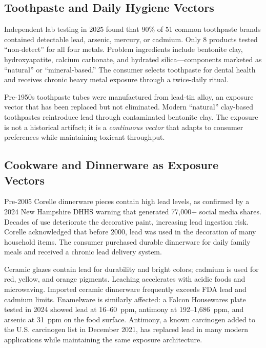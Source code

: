 \subsection{Toothpaste and Daily Hygiene Vectors}

Independent lab testing in 2025 found that 90\% of 51 common toothpaste brands contained detectable lead, arsenic, mercury, or cadmium. Only 8 products tested ``non-detect'' for all four metals. Problem ingredients include bentonite clay, hydroxyapatite, calcium carbonate, and hydrated silica---components marketed as ``natural'' or ``mineral-based.'' The consumer selects toothpaste for dental health and receives chronic heavy metal exposure through a twice-daily ritual.

Pre-1950s toothpaste tubes were manufactured from lead-tin alloy, an exposure vector that has been replaced but not eliminated. Modern ``natural'' clay-based toothpastes reintroduce lead through contaminated bentonite clay. The exposure is not a historical artifact; it is a \textit{continuous vector} that adapts to consumer preferences while maintaining toxicant throughput.

\subsection{Cookware and Dinnerware as Exposure Vectors}

Pre-2005 Corelle dinnerware pieces contain high lead levels, as confirmed by a 2024 New Hampshire DHHS warning that generated 77,000+ social media shares. Decades of use deteriorate the decorative paint, increasing lead ingestion risk. Corelle acknowledged that before 2000, lead was used in the decoration of many household items. The consumer purchased durable dinnerware for daily family meals and received a chronic lead delivery system.

Ceramic glazes contain lead for durability and bright colors; cadmium is used for red, yellow, and orange pigments. Leaching accelerates with acidic foods and microwaving. Imported ceramic dinnerware frequently exceeds FDA lead and cadmium limits. Enamelware is similarly affected: a Falcon Housewares plate tested in 2024 showed lead at 16--60~ppm, antimony at 192--1,686~ppm, and arsenic at 31~ppm on the food surface. Antimony, a known carcinogen added to the U.S. carcinogen list in December 2021, has replaced lead in many modern applications while maintaining the same exposure architecture.

